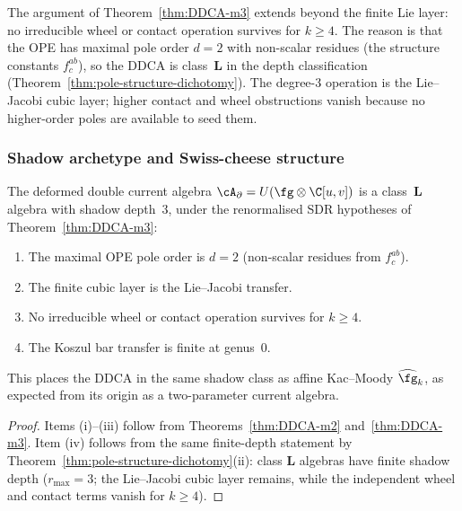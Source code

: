 \begin{remark}
\label{rem:DDCA-formality}
The argument of Theorem~\ref{thm:DDCA-m3} extends beyond the
finite Lie layer: no irreducible wheel or contact operation
survives for $k \ge 4$.
The reason is that the OPE has maximal pole order $d = 2$
with non-scalar residues (the structure constants
$f^{ab}_c$), so the DDCA is class~$\mathbf{L}$ in the
depth classification
(Theorem~\ref{thm:pole-structure-dichotomy}). The
degree-$3$ operation is the Lie--Jacobi cubic layer; higher
contact and wheel obstructions vanish because no higher-order
poles are available to seed them.
\end{remark}

\subsubsection{Shadow archetype and Swiss-cheese structure}

\begin{proposition}
\label{prop:DDCA-shadow}
The deformed double current algebra
$\cA_\partial = U(\fg \otimes \C[u,v])$ is a
class~$\mathbf{L}$ algebra with shadow depth~$3$, under the
renormalised SDR hypotheses of Theorem~\ref{thm:DDCA-m3}:
\begin{enumerate}[label=\textup{(\roman*)},nosep]
\item The maximal OPE pole order is $d = 2$
 (non-scalar residues from $f^{ab}_c$).
\item The finite cubic layer is the Lie--Jacobi transfer.
\item No irreducible wheel or contact operation survives for
 $k \ge 4$.
\item The Koszul bar transfer is finite at genus~$0$.
\end{enumerate}
This places the DDCA in the same shadow class as affine
Kac--Moody $\widehat{\fg}_k$, as expected from its
origin as a two-parameter current algebra.
\end{proposition}

\begin{proof}
Items (i)--(iii) follow from
Theorems~\ref{thm:DDCA-m2} and~\ref{thm:DDCA-m3}.
Item (iv) follows from the same finite-depth statement by
Theorem~\ref{thm:pole-structure-dichotomy}(ii): class
$\mathbf{L}$ algebras have finite shadow depth
($r_{\max} = 3$; the Lie--Jacobi cubic layer remains, while
the independent wheel and contact terms vanish for $k \ge 4$).
\end{proof}

